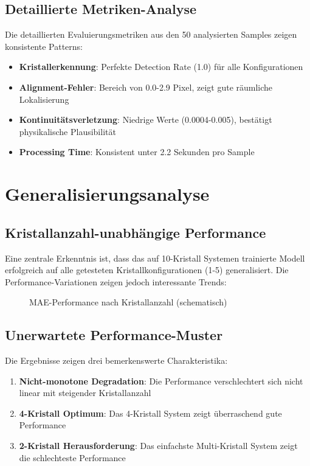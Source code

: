 \documentclass[12pt,twoside,openright]{scrreprt}
\theoremstyle{definition}
\theoremstyle{plain}
\begin{document}
\subsection{Detaillierte Metriken-Analyse}

Die detaillierten Evaluierungsmetriken aus den 50 analysierten Samples zeigen konsistente Patterns:

\begin{itemize}
    \item \textbf{Kristallerkennung}: Perfekte Detection Rate (1.0) für alle Konfigurationen
    \item \textbf{Alignment-Fehler}: Bereich von 0.0-2.9 Pixel, zeigt gute räumliche Lokalisierung
    \item \textbf{Kontinuitätsverletzung}: Niedrige Werte (0.0004-0.005), bestätigt physikalische Plausibilität
    \item \textbf{Processing Time}: Konsistent unter 2.2 Sekunden pro Sample
\end{itemize}

\section{Generalisierungsanalyse}

\subsection{Kristallanzahl-unabhängige Performance}

Eine zentrale Erkenntnis ist, dass das auf 10-Kristall Systemen trainierte Modell erfolgreich auf alle getesteten Kristallkonfigurationen (1-5) generalisiert. Die Performance-Variationen zeigen jedoch interessante Trends:

\begin{figure}[htbp]
\centering
\caption{MAE-Performance nach Kristallanzahl (schematisch)}
\label{fig:mae_performance}
\end{figure}

\subsection{Unerwartete Performance-Muster}

Die Ergebnisse zeigen drei bemerkenswerte Charakteristika:

\begin{enumerate}
    \item \textbf{Nicht-monotone Degradation}: Die Performance verschlechtert sich nicht linear mit steigender Kristallanzahl
    \item \textbf{4-Kristall Optimum}: Das 4-Kristall System zeigt überraschend gute Performance
    \item \textbf{2-Kristall Herausforderung}: Das einfachste Multi-Kristall System zeigt die schlechteste Performance
\end{enumerate}
\end{document}
